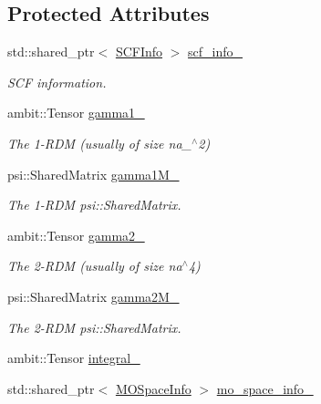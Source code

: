 \subsection*{Protected Attributes}
\begin{DoxyCompactItemize}
\item 
std\+::shared\+\_\+ptr$<$ \mbox{\hyperlink{classforte_1_1_s_c_f_info}{S\+C\+F\+Info}} $>$ \mbox{\hyperlink{classforte_1_1_orbital_optimizer_ac4e79f71738bfa62f3681e3e12240b67}{scf\+\_\+info\+\_\+}}
\begin{DoxyCompactList}\small\item\em S\+CF information. \end{DoxyCompactList}\item 
ambit\+::\+Tensor \mbox{\hyperlink{classforte_1_1_orbital_optimizer_a5b7f6953dfef1cefc76a3ef06e1f5fba}{gamma1\+\_\+}}
\begin{DoxyCompactList}\small\item\em The 1-\/\+R\+DM (usually of size na\+\_\+$^\wedge$2) \end{DoxyCompactList}\item 
psi\+::\+Shared\+Matrix \mbox{\hyperlink{classforte_1_1_orbital_optimizer_a9812763f6f70ec990d121946d45d07b4}{gamma1\+M\+\_\+}}
\begin{DoxyCompactList}\small\item\em The 1-\/\+R\+DM psi\+::\+Shared\+Matrix. \end{DoxyCompactList}\item 
ambit\+::\+Tensor \mbox{\hyperlink{classforte_1_1_orbital_optimizer_aa049ad4cf277246ec54a0c2182a9cde5}{gamma2\+\_\+}}
\begin{DoxyCompactList}\small\item\em The 2-\/\+R\+DM (usually of size na$^\wedge$4) \end{DoxyCompactList}\item 
psi\+::\+Shared\+Matrix \mbox{\hyperlink{classforte_1_1_orbital_optimizer_aeb2414ef0595d7afc2136c28235611d8}{gamma2\+M\+\_\+}}
\begin{DoxyCompactList}\small\item\em The 2-\/\+R\+DM psi\+::\+Shared\+Matrix. \end{DoxyCompactList}\item 
ambit\+::\+Tensor \mbox{\hyperlink{classforte_1_1_orbital_optimizer_aad19beb900203fb849891aa8657ccc94}{integral\+\_\+}}
\item 
std\+::shared\+\_\+ptr$<$ \mbox{\hyperlink{classforte_1_1_m_o_space_info}{M\+O\+Space\+Info}} $>$ \mbox{\hyperlink{classforte_1_1_orbital_optimizer_a426be7cb09565f97b09c80f6007e975a}{mo\+\_\+space\+\_\+info\+\_\+}}

\end{DoxyCompactItemize}
